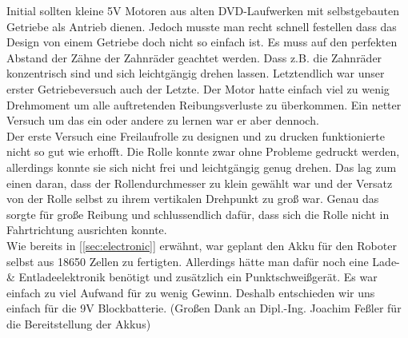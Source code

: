 \begin{flushleft}
        Initial sollten kleine 5V Motoren aus alten DVD-Laufwerken mit selbstgebauten Getriebe als Antrieb dienen.
        Jedoch musste man recht schnell festellen dass das Design von einem Getriebe doch nicht so einfach ist.
        Es muss auf den perfekten Abstand der Zähne der Zahnräder geachtet werden. Dass z.B. die Zahnräder konzentrisch sind und 
        sich leichtgängig drehen lassen. Letztendlich war unser erster Getriebeversuch auch der Letzte.
        Der Motor hatte einfach viel zu wenig Drehmoment um alle auftretenden Reibungsverluste zu überkommen.
        Ein netter Versuch um das ein oder andere zu lernen war er aber dennoch.
        \\
        Der erste Versuch eine Freilaufrolle zu designen und zu drucken funktionierte nicht so gut wie erhofft.
        Die Rolle konnte zwar ohne Probleme gedruckt werden, allerdings konnte sie sich nicht frei und leichtgängig genug drehen.
        Das lag zum einen daran, dass der Rollendurchmesser zu klein gewählt war und der Versatz von der Rolle selbst zu ihrem vertikalen Drehpunkt zu groß war.
        Genau das sorgte für große Reibung und schlussendlich dafür, dass sich die Rolle nicht in Fahrtrichtung ausrichten konnte.
        \\
        Wie bereits in [\ref{sec:electronic}] erwähnt, war geplant den Akku für den Roboter selbst aus 18650 Zellen zu fertigten.
        Allerdings hätte man dafür noch eine Lade- \& Entladeelektronik benötigt und zusätzlich ein Punktschweißgerät.
        Es war einfach zu viel Aufwand für zu wenig Gewinn. Deshalb entschieden wir uns einfach für die 9V Blockbatterie.
        (Großen Dank an Dipl.-Ing. Joachim Feßler für die Bereitstellung der Akkus)

\end{flushleft}